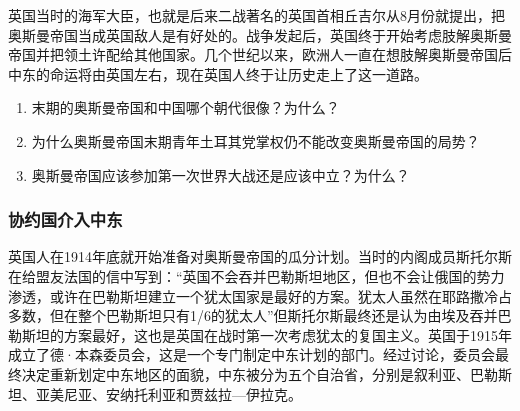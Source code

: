 \documentclass{article}
\begin{document}
英国当时的海军大臣，也就是后来二战著名的英国首相丘吉尔从8月份就提出，把奥斯曼帝国当成英国敌人是有好处的。战争发起后，英国终于开始考虑肢解奥斯曼帝国并把领土许配给其他国家。几个世纪以来，欧洲人一直在想肢解奥斯曼帝国后中东的命运将由英国左右，现在英国人终于让历史走上了这一道路。\\
\begin{enumerate}
    \small
    \item 末期的奥斯曼帝国和中国哪个朝代很像？为什么？
    \item 为什么奥斯曼帝国末期青年土耳其党掌权仍不能改变奥斯曼帝国的局势？
    \item 奥斯曼帝国应该参加第一次世界大战还是应该中立？为什么？
\end{enumerate}
\subsubsection{协约国介入中东}
\normalsize
\selectfont
英国人在1914年底就开始准备对奥斯曼帝国的瓜分计划。当时的内阁成员斯托尔斯在给盟友法国的信中写到：“英国不会吞并巴勒斯坦地区，但也不会让俄国的势力渗透，或许在巴勒斯坦建立一个犹太国家是最好的方案。犹太人虽然在耶路撒冷占多数，但在整个巴勒斯坦只有1/6的犹太人”但斯托尔斯最终还是认为由埃及吞并巴勒斯坦的方案最好，这也是英国在战时第一次考虑犹太的复国主义。英国于1915年成立了德·本森委员会，这是一个专门制定中东计划的部门。经过讨论，委员会最终决定重新划定中东地区的面貌，中东被分为五个自治省，分别是叙利亚、巴勒斯坦、亚美尼亚、安纳托利亚和贾兹拉—伊拉克。
\end{document}

